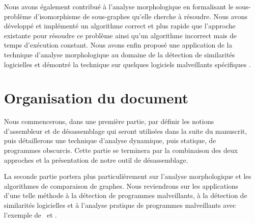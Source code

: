 Nous avons également contribué à l’analyse morphologique en formalisant le sous-problème d’isomorphisme de sous-graphes qu’elle cherche à résoudre. Nous avons développé et implémenté un algorithme correct et plus rapide que l'approche existante pour résoudre ce problème ainsi qu’un algorithme incorrect mais de temps d’exécution constant. Nous avons enfin proposé une application de la technique d’analyse morphologique au domaine de la détection de similarités logicielles \cite{REAT12,mal12} et démontré la technique sur quelques logiciels malveillants spécifiques \cite{sstic13,mal13}.
\section*{Organisation du document}

Nous commencerons, dans une première partie, par définir les notions d'assembleur et de désassemblage qui seront utilisées dans la suite du manuscrit, puis détaillerons une technique d'analyse dynamique, puis statique, de programmes obscurcis. Cette partie se terminera par la combinaison des deux approches et la présentation de notre outil de désassemblage.

La seconde partie portera plus particulièrement sur l'analyse morphologique et les algorithmes de comparaison de graphes. Nous reviendrons sur les applications d'une telle méthode à la détection de programmes malveillants, à la détection de similarités logicielles et à l'analyse pratique de programmes malveillants avec l'exemple de \duqu\ et \stux.
